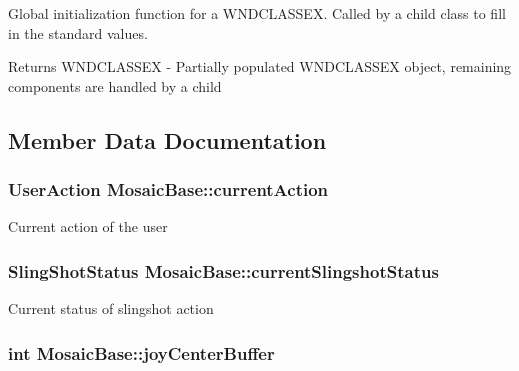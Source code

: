 Global initialization function for a WNDCLASSEX. Called by a child class to fill in the standard values. 

\begin{DoxyReturn}{Returns}
WNDCLASSEX -\/ Partially populated WNDCLASSEX object, remaining components are handled by a child 
\end{DoxyReturn}


\subsection{Member Data Documentation}
\hypertarget{class_mosaic_base_a4eced8c64162103aec35721994c4ea17}{
\subsubsection[{currentAction}]{\setlength{\rightskip}{0pt plus 5cm}UserAction {\bf MosaicBase::currentAction}}}
\label{class_mosaic_base_a4eced8c64162103aec35721994c4ea17}
Current action of the user \hypertarget{class_mosaic_base_afa06f2fefb998724242cd4cb6e826a36}{
\subsubsection[{currentSlingshotStatus}]{\setlength{\rightskip}{0pt plus 5cm}SlingShotStatus {\bf MosaicBase::currentSlingshotStatus}}}
\label{class_mosaic_base_afa06f2fefb998724242cd4cb6e826a36}
Current status of slingshot action \hypertarget{class_mosaic_base_a42f2ff99dc054743a0012864a9ede20d}{
\subsubsection[{joyCenterBuffer}]{\setlength{\rightskip}{0pt plus 5cm}int {\bf MosaicBase::joyCenterBuffer}}}
\label{class_mosaic_base_a42f2ff99dc054743a0012864a9ede20d}

